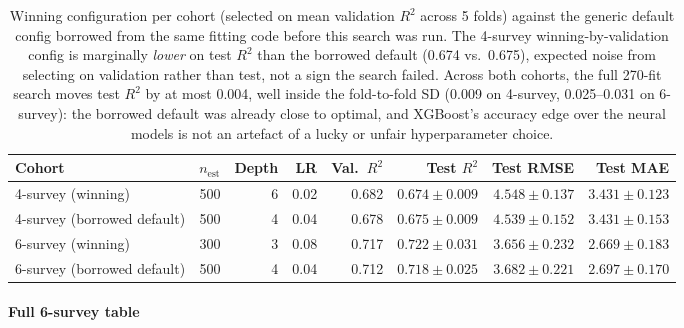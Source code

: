 \begin{table}[H]
\centering
\scriptsize
\renewcommand{\arraystretch}{1.1}
\begin{tabular}{lrrrrrrr}
\toprule
Cohort & $n_{\mathrm{est}}$ & Depth & LR & Val.\ $R^2$ & Test $R^2$ & Test RMSE & Test MAE \\
\midrule
4-survey (winning) & 500 & 6 & 0.02 & 0.682 & $0.674\pm0.009$ & $4.548\pm0.137$ & $3.431\pm0.123$ \\
4-survey (borrowed default) & 500 & 4 & 0.04 & 0.678 & $0.675\pm0.009$ & $4.539\pm0.152$ & $3.431\pm0.153$ \\
6-survey (winning) & 300 & 3 & 0.08 & 0.717 & $0.722\pm0.031$ & $3.656\pm0.232$ & $2.669\pm0.183$ \\
6-survey (borrowed default) & 500 & 4 & 0.04 & 0.712 & $0.718\pm0.025$ & $3.682\pm0.221$ & $2.697\pm0.170$ \\
\bottomrule
\end{tabular}
\caption{\small{Winning configuration per cohort (selected on mean validation $R^2$ across 5
folds) against the generic default config borrowed from the same fitting code before this
search was run. The 4-survey winning-by-validation config is marginally \emph{lower} on test
$R^2$ than the borrowed default (0.674 vs.\ 0.675), expected noise from selecting on
validation rather than test, not a sign the search failed. Across both cohorts, the full
270-fit search moves test $R^2$ by at most 0.004, well inside the fold-to-fold SD (0.009 on
4-survey, 0.025--0.031 on 6-survey): the borrowed default was already close to optimal, and
XGBoost's accuracy edge over the neural models is not an artefact of a lucky or unfair
hyperparameter choice.}}
\label{tab:xgb-hyperparameter-search}
\end{table}

\paragraph*{Full 6-survey table}
\label{app:results-q3-6survey}

